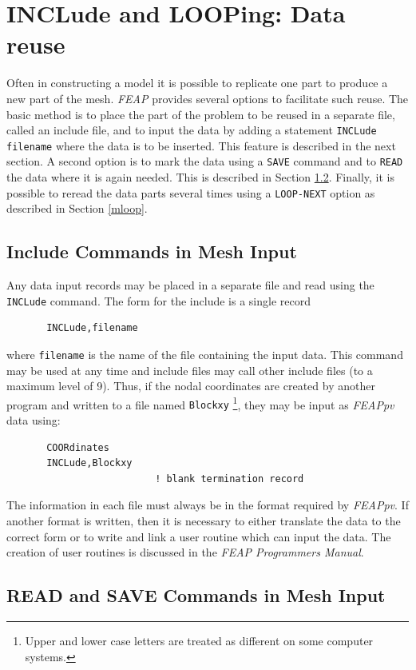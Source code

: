 \section{INCLude and LOOPing: Data reuse}
\label{subst}

Often in constructing a model it is possible to replicate one part to produce
a new part of the mesh.  \textsl{FEAP} provides several options to facilitate
such reuse.  The basic method is to place the part of the problem to be
reused in a separate file, called an include file, and to input the data by
adding a statement \texttt{INCLude filename} where the data is to be
inserted.  This feature is described in the next section.  A second option
is to mark the data using a \texttt{SAVE} command and to \texttt{READ} the
data where it is again needed.  This is described in Section \ref{save}.
Finally, it is possible to reread the data parts several times using a
\texttt{LOOP-NEXT} option as described in Section \ref{mloop}.

\subsection{Include Commands in Mesh Input}

Any data input records may be placed in a separate file and read using
the {\tt INCLude} command.  The form for the include is a single record
\begin{verbatim}
       INCLude,filename
\end{verbatim}
where {\tt filename} is the name of the file containing the input data.
This command may be used at any time and include files may call other
include files (to a maximum level of 9).  Thus, if the nodal coordinates
are created by another program and written to a file named {\tt Blockxy}
{\footnote{Upper and lower case letters are treated as different on 
some computer systems.}},
they may be input as {\sl FEAPpv} data using:
\begin{verbatim}
       COORdinates
       INCLude,Blockxy
                          ! blank termination record
\end{verbatim}
The information in each file must always be in the format required by
{\sl FEAPpv}.
If another format is written, then it is necessary to either translate the
data to the correct form or to write and link a user routine which can
input the data.
The creation of user routines is discussed in the {\sl FEAP Programmers
Manual}.

\subsection{READ and SAVE Commands in Mesh Input}
\label{save}

